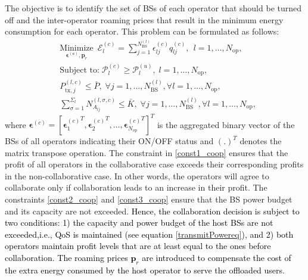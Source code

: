 \documentclass[10pt, letter, twocolumn]{IEEEtran}
\begin{document}
The objective is to identify the set of BSs of each operator that should be turned off and the inter-operator roaming prices that result in the minimum energy consumption for each operator. This problem can be formulated as follows:
\begin{align}
&\underset{\boldsymbol{\boldsymbol{\epsilon}^{(c)}}, \mathbf{p}_{r} }{\text{Minimize}} \,\,\,{\mathcal E}_l^{(c)} = \sum_{j=1}^{N_{\mathrm{BS}}^{(l)}}\epsilon^{(c)}_{lj} q_{lj}^{(c)}, \ \ l = 1,\ldots,N_{\text{op}}, \label{eq_collaborative}\\
&\text{Subject to:}\;
\mathcal{P}_{l}^{(c)} \geq \mathcal{P}_{l}^{(u)}, \; l = 1,\ldots, N_{\text{op}},  \label{const1_coop} \\
&P_{\text{tx},j}^{(l,c)} \leq \bar{P}, \; \forall j = 1,\ldots, N_{\text{BS}}^{(l)} , \forall l = 1,\ldots, N_{\text{op}},  \label{const2_coop} \\
&\sum_{\sigma=1}^{\Sigma_l}N_{A_{lj}}^{(l,\sigma,c)} \leq \bar{K} , \; \forall j = 1,\ldots, N_{\text{BS}}^{(l)} , \forall l = 1,\ldots, N_{\text{op}}, \label{const3_coop}
\end{align}
where $\boldsymbol{\epsilon}^{(c)} = [{\boldsymbol{\epsilon}_{1}^{(c)}}^{T},  {\boldsymbol{\epsilon}_{2}^{(c)}}^{T}, \ldots,
{\boldsymbol{\epsilon}_{N_{\text{op}}}^{(c)}}^{T}]^{T}$ is the aggregated binary vector of the BSs of all operators indicating their ON/OFF status and $(.)^{T}$ denotes the matrix transpose operation. The constraint in \eqref{const1_coop} ensures that the profit of all operators in the collaborative case exceeds their corresponding profits in the non-collaborative case. In other words, the operators will agree to collaborate only if collaboration leads to an increase in their profit. The constraints \eqref{const2_coop} and \eqref{const3_coop} ensure that the BS power budget and its capacity are not exceeded. \textcolor{black}{Hence, the collaboration decision is subject to two conditions: 1) the capacity and power budget of the host BSs are not exceeded,i.e., QoS is maintained (see equation \eqref{transmitPowereq}), and 2) both operators maintain profit levels that are at least equal to the ones before collaboration. The roaming prices $\mathbf{p}_{r}$ are introduced to compensate the cost of the extra energy consumed by the host operator to serve the offloaded users.}
\end{document}
